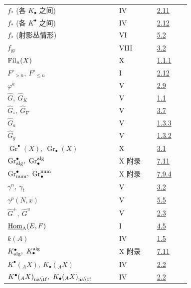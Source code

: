 \begin{longtable}{@{}>{\raggedright\arraybackslash}p{0.50\linewidth}>{\raggedright\arraybackslash}p{0.17\linewidth}>{\raggedright\arraybackslash}p{0.15\linewidth}@{}}
\(f_*\) (各 \(K_\bullet\) 之间) & IV & \hyperlink{sga6.e04.para.2-11}{2.11}\\
\(f_*\) (各 \(K^\bullet\) 之间) & IV & \hyperlink{sga6.e04.para.2-12}{2.12}\\
\(f_*\) (射影丛情形) & VI & \hyperlink{sga6.e06.sec.5.2}{5.2}\\
\(f_{\operatorname{gr}}\) & VIII & \hyperlink{sga6.e08.prop.3-2}{3.2}\\
\(\operatorname{Fil}_n(X)\) & X & \hyperlink{sga6.e10.def.1-1-1}{1.1.1}\\
\(F'_{>n},\ F'_{\leq n}\) & I & \hyperlink{sga6.e01.prop.2-12}{2.12}\\
\(\varphi^a\) & V & \hyperlink{sga6.e05.para.2-9}{2.9}\\
\(\widehat G,\ \widehat G_K\) & V & \hyperlink{sga6.e05.para.1-1}{1.1}\\
\(\widehat G_{\circ},\ \widehat G_{\nabla}\) & V & \hyperlink{sga6.e05.para.3-7}{3.7}\\
\(\widehat G_a\) & V & \hyperlink{sga6.e05.para.1-3}{1.3.3}\\
\(\widehat G_g\) & V & \hyperlink{sga6.e05.para.1-3}{1.3.2}\\
\(\operatorname{Gr}^\bullet(X),\ \operatorname{Gr}_\bullet(X)\) & X & \hyperlink{sga6.e10.sec.3.1}{3.1}\\
\(\operatorname{Gr}^\bullet_{\alg},\ \operatorname{Gr}^{\alg}_\bullet\) & X 附录 & \hyperlink{sga6.e10.para.7-11}{7.11}\\
\(\operatorname{Gr}^\bullet_{\num},\ \operatorname{Gr}^{\num}_\bullet\) & X 附录 & \hyperlink{sga6.e10.para.7-9-4}{7.9.4}\\
\(\gamma^n,\ \gamma_t\) & V & \hyperlink{sga6.e05.prop.3-2}{3.2}\\
\(\gamma^p(N,x)\) & V & \hyperlink{sga6.e05.para.5-5}{5.5}\\
\(\widehat G^+,\ \widehat G^u\) & V & \hyperlink{sga6.e05.para.2-3}{2.3}\\
\(\underline{\operatorname{Hom}}_{\Lambda}(E,F)\) & I & \hyperlink{sga6.e01.notation.4-5}{4.5}\\
\(k(A)\) & IV & \hyperlink{sga6.e04.para.1-5}{1.5}\\
\(K^\bullet_{\operatorname{alg}},\ K^{\operatorname{alg}}_\bullet\) & X 附录 & \hyperlink{sga6.e10.para.7-11}{7.11}\\
\(K^\bullet({}_A X),\ K_\bullet({}_A X)\) & IV & \hyperlink{sga6.e04.def.2-2}{2.2}\\
\(K^\bullet({}_A X)_{\naif},\ K_\bullet({}_A X)_{\naif}\) & IV & \hyperlink{sga6.e04.def.2-2}{2.2}\\

\end{longtable}
